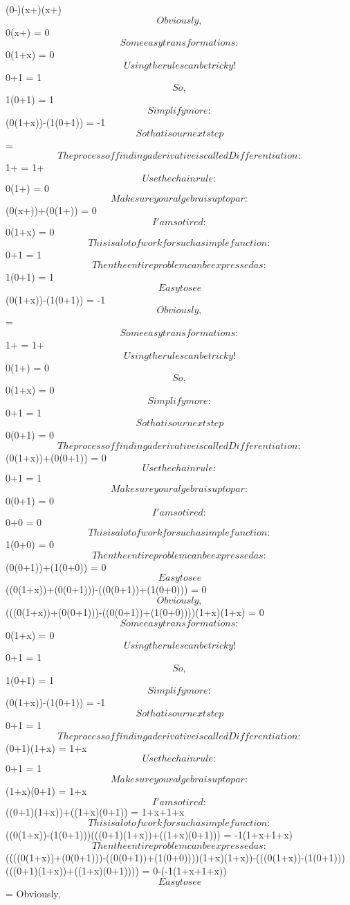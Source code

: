 \documentclass[12pt]{article}
\begin{document}
(0-)\cdot (x+)\cdot (x+)$$Obviously, $$0\cdot (x+) = 0$$Some easy transformations: $$0\cdot (1+x) = 0$$Using the rules can be tricky!$$0+1 = 1$$So, $$1\cdot (0+1) = 1$$Simplify more: $$(0\cdot (1+x))-(1\cdot (0+1)) = -1$$So that is our next step$$ = $$The process of finding a derivative is called Differentiation: $$1+ = 1+$$Use the chain rule: $$0\cdot (1+) = 0$$Make sure your algebra is up to par: $$(0\cdot (x+))+(0\cdot (1+)) = 0$$I'am so tired: $$0\cdot (1+x) = 0$$This is a lot of work for such a simple function: $$0+1 = 1$$Then the entire problem can be expressed as: $$1\cdot (0+1) = 1$$Easy to see$$(0\cdot (1+x))-(1\cdot (0+1)) = -1$$Obviously, $$ = $$Some easy transformations: $$1+ = 1+$$Using the rules can be tricky!$$0\cdot (1+) = 0$$So, $$0\cdot (1+x) = 0$$Simplify more: $$0+1 = 1$$So that is our next step$$0\cdot (0+1) = 0$$The process of finding a derivative is called Differentiation: $$(0\cdot (1+x))+(0\cdot (0+1)) = 0$$Use the chain rule: $$0+1 = 1$$Make sure your algebra is up to par: $$0\cdot (0+1) = 0$$I'am so tired: $$0+0 = 0$$This is a lot of work for such a simple function: $$1\cdot (0+0) = 0$$Then the entire problem can be expressed as: $$(0\cdot (0+1))+(1\cdot (0+0)) = 0$$Easy to see$$((0\cdot (1+x))+(0\cdot (0+1)))-((0\cdot (0+1))+(1\cdot (0+0))) = 0$$Obviously, $$(((0\cdot (1+x))+(0\cdot (0+1)))-((0\cdot (0+1))+(1\cdot (0+0))))\cdot (1+x)\cdot (1+x) = 0$$Some easy transformations: $$0\cdot (1+x) = 0$$Using the rules can be tricky!$$0+1 = 1$$So, $$1\cdot (0+1) = 1$$Simplify more: $$(0\cdot (1+x))-(1\cdot (0+1)) = -1$$So that is our next step$$0+1 = 1$$The process of finding a derivative is called Differentiation: $$(0+1)\cdot (1+x) = 1+x$$Use the chain rule: $$0+1 = 1$$Make sure your algebra is up to par: $$(1+x)\cdot (0+1) = 1+x$$I'am so tired: $$((0+1)\cdot (1+x))+((1+x)\cdot (0+1)) = 1+x+1+x$$This is a lot of work for such a simple function: $$((0\cdot (1+x))-(1\cdot (0+1)))\cdot (((0+1)\cdot (1+x))+((1+x)\cdot (0+1))) = -1\cdot (1+x+1+x)$$Then the entire problem can be expressed as: $$((((0\cdot (1+x))+(0\cdot (0+1)))-((0\cdot (0+1))+(1\cdot (0+0))))\cdot (1+x)\cdot (1+x))-(((0\cdot (1+x))-(1\cdot (0+1)))\cdot (((0+1)\cdot (1+x))+((1+x)\cdot (0+1)))) = 0-(-1\cdot (1+x+1+x))$$Easy to see$$ = $$Obviously, 
\end{document}
